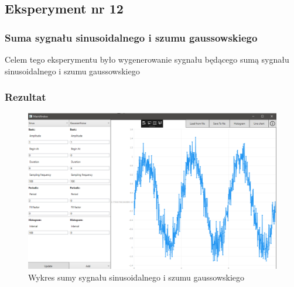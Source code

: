 \documentclass[12pt]{article}
\begin{document}


\subsection{Eksperyment nr 12 }
\subsubsection{Suma sygnału sinusoidalnego i szumu gaussowskiego}
Celem tego eksperymentu było wygenerowanie sygnału będącego sumą sygnału sinusoidalnego i szumu gaussowskiego


\subsubsection{Rezultat}

\begin{figure}[H]
 \centering
 \includegraphics[width=14cm]{images/addsingauss1.PNG}
 \vspace{-0.3cm}
 \caption{Wykres sumy sygnału sinusoidalnego i szumu gaussowskiego}
 \label{gui}
\end{figure}
\end{document}
